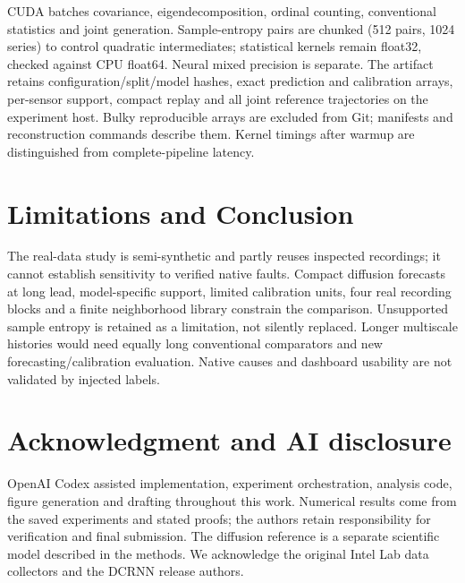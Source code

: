 \documentclass[conference]{IEEEtran}
\begin{document}
CUDA batches covariance, eigendecomposition, ordinal counting, conventional
statistics and joint generation. Sample-entropy pairs are chunked (512 pairs,
1024 series) to control quadratic intermediates; statistical kernels remain
float32, checked against CPU float64. Neural mixed precision is separate.
The artifact retains configuration/split/model hashes, exact prediction and
calibration arrays, per-sensor support, compact replay and all joint reference
trajectories on the experiment host. Bulky reproducible arrays are excluded
from Git; manifests and reconstruction commands describe them. Kernel timings
after warmup are distinguished from complete-pipeline latency.


\section{Limitations and Conclusion}

The real-data study is semi-synthetic and partly reuses inspected recordings;
it cannot establish sensitivity to verified native faults. Compact diffusion
forecasts at long lead, model-specific support, limited calibration units,
four real recording blocks and a finite neighborhood library constrain the
comparison. Unsupported sample entropy is retained as a limitation, not silently
replaced. Longer multiscale histories would need equally long conventional
comparators and new forecasting/calibration evaluation. Native causes and
dashboard usability are not validated by injected labels.

\section*{Acknowledgment and AI disclosure}
OpenAI Codex assisted implementation, experiment orchestration, analysis code,
figure generation and drafting throughout this work. Numerical results come
from the saved experiments and stated proofs; the authors retain responsibility
for verification and final submission. The diffusion reference is a separate
scientific model described in the methods. We acknowledge the original Intel
Lab data collectors and the DCRNN release authors.


\end{document}
